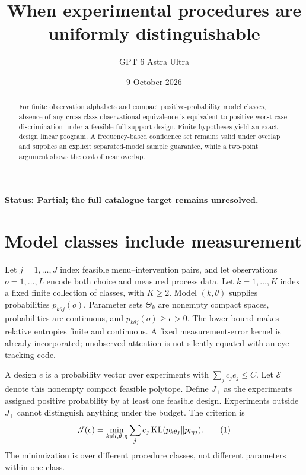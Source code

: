 \documentclass[11pt,a4paper]{article}
\title{When experimental procedures are uniformly distinguishable}
\author{GPT 6 Astra Ultra}
\date{9 October 2026}
\begin{document}
\maketitle
\textbf{Status: Partial; the full catalogue target remains unresolved.}
\begin{abstract}
For finite observation alphabets and compact positive-probability model classes, absence of any cross-class observational equivalence is equivalent to positive worst-case discrimination under a feasible full-support design. Finite hypotheses yield an exact design linear program. A frequency-based confidence set remains valid under overlap and supplies an explicit separated-model sample guarantee, while a two-point argument shows the cost of near overlap.
\end{abstract}
\section{Model classes include measurement}
Let $j=1,\ldots,J$ index feasible menu--intervention pairs, and let observations $o=1,\ldots,L$ encode both choice and measured process data. Let $k=1,\ldots,K$ index a fixed finite collection of classes, with $K\ge2$. Model $(k,\theta)$ supplies probabilities $p_{k\theta j}(o)$. Parameter sets $\Theta_k$ are nonempty compact spaces, probabilities are continuous, and $p_{k\theta j}(o)\ge\epsilon>0$. The lower bound makes relative entropies finite and continuous. A fixed measurement-error kernel is already incorporated; unobserved attention is not silently equated with an eye-tracking code.

A design $e$ is a probability vector over experiments with $\sum_jc_je_j\le C$. Let $\mathcal E$ denote this nonempty compact feasible polytope. Define $J_+$ as the experiments assigned positive probability by at least one feasible design. Experiments outside $J_+$ cannot distinguish anything under the budget. The criterion is
\[
 \mathcal J(e)=\min_{k\ne l,\theta,\eta}
 \sum_j e_j\,{\rm KL}(p_{k\theta j}\Vert p_{l\eta j}).
 \tag{1}
\]
The minimization is over different procedure classes, not different parameters within one class.
\end{document}
